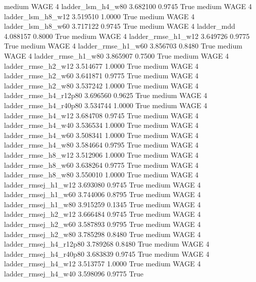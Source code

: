     medium     WAGE                 4      ladder_lsm_h4_w80   3.682100      0.9745    True
    medium     WAGE                 4      ladder_lsm_h8_w12   3.519510      1.0000    True
    medium     WAGE                 4      ladder_lsm_h8_w60   3.717122      0.9745    True
    medium     WAGE                 4             ladder_mdd   4.088157      0.8000    True
    medium     WAGE                 4     ladder_rmse_h1_w12   3.649726      0.9775    True
    medium     WAGE                 4     ladder_rmse_h1_w60   3.856703      0.8480    True
    medium     WAGE                 4     ladder_rmse_h1_w80   3.865907      0.7500    True
    medium     WAGE                 4     ladder_rmse_h2_w12   3.514677      1.0000    True
    medium     WAGE                 4     ladder_rmse_h2_w60   3.641871      0.9775    True
    medium     WAGE                 4     ladder_rmse_h2_w80   3.537242      1.0000    True
    medium     WAGE                 4  ladder_rmse_h4_r12p80   3.696560      0.9625    True
    medium     WAGE                 4  ladder_rmse_h4_r40p80   3.534744      1.0000    True
    medium     WAGE                 4     ladder_rmse_h4_w12   3.684708      0.9745    True
    medium     WAGE                 4     ladder_rmse_h4_w40   3.536534      1.0000    True
    medium     WAGE                 4     ladder_rmse_h4_w60   3.508341      1.0000    True
    medium     WAGE                 4     ladder_rmse_h4_w80   3.584664      0.9795    True
    medium     WAGE                 4     ladder_rmse_h8_w12   3.512906      1.0000    True
    medium     WAGE                 4     ladder_rmse_h8_w60   3.638264      0.9775    True
    medium     WAGE                 4     ladder_rmse_h8_w80   3.550010      1.0000    True
    medium     WAGE                 4    ladder_rmsej_h1_w12   3.693080      0.9745    True
    medium     WAGE                 4    ladder_rmsej_h1_w60   3.744006      0.8795    True
    medium     WAGE                 4    ladder_rmsej_h1_w80   3.915259      0.1345    True
    medium     WAGE                 4    ladder_rmsej_h2_w12   3.666484      0.9745    True
    medium     WAGE                 4    ladder_rmsej_h2_w60   3.587893      0.9795    True
    medium     WAGE                 4    ladder_rmsej_h2_w80   3.785298      0.8480    True
    medium     WAGE                 4 ladder_rmsej_h4_r12p80   3.789268      0.8480    True
    medium     WAGE                 4 ladder_rmsej_h4_r40p80   3.683839      0.9745    True
    medium     WAGE                 4    ladder_rmsej_h4_w12   3.513757      1.0000    True
    medium     WAGE                 4    ladder_rmsej_h4_w40   3.598096      0.9775    True
